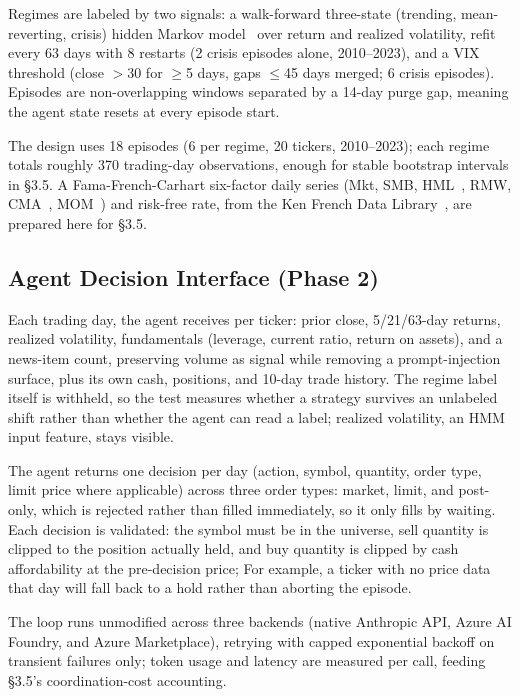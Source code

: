 \documentclass{article}
\begin{document}
Regimes are labeled by two signals: a walk-forward three-state (trending, mean-reverting, crisis) hidden Markov model~\cite{hamilton1989} over return and realized volatility, refit every 63 days with 8 restarts (2 crisis episodes alone, 2010--2023), and a VIX threshold (close $>$30 for $\geq$5 days, gaps $\leq$45 days merged; 6 crisis episodes). Episodes are non-overlapping windows separated by a 14-day purge gap, meaning the agent state resets at every episode start.

The design uses 18 episodes (6 per regime, 20 tickers, 2010--2023); each regime totals roughly 370 trading-day observations, enough for stable bootstrap intervals in \S3.5. A Fama-French-Carhart six-factor daily series (Mkt, SMB, HML~\cite{fama1993}, RMW, CMA~\cite{fama2015}, MOM~\cite{carhart1997}) and risk-free rate, from the Ken French Data Library~\cite{frenchlib}, are prepared here for \S3.5.

\subsection{Agent Decision Interface (Phase 2)}

Each trading day, the agent receives per ticker: prior close, 5/21/63-day returns, realized volatility, fundamentals (leverage, current ratio, return on assets), and a news-item count, preserving volume as signal while removing a prompt-injection surface, plus its own cash, positions, and 10-day trade history. The regime label itself is withheld, so the test measures whether a strategy survives an unlabeled shift rather than whether the agent can read a label; realized volatility, an HMM input feature, stays visible.

The agent returns one decision per day (action, symbol, quantity, order type, limit price where applicable) across three order types: market, limit, and post-only, which is rejected rather than filled immediately, so it only fills by waiting. Each decision is validated: the symbol must be in the universe, sell quantity is clipped to the position actually held, and buy quantity is clipped by cash affordability at the pre-decision price; For example, a ticker with no price data that day will fall back to a hold rather than aborting the episode.

The loop runs unmodified across three backends (native Anthropic API, Azure AI Foundry, and Azure Marketplace), retrying with capped exponential backoff on transient failures only; token usage and latency are measured per call, feeding \S3.5's coordination-cost accounting.
\end{document}

